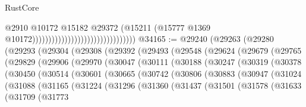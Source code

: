 \begin{lexlean}{RustCore}
\begin{coremodule}
                                                                @2910
                                                                @10172
                                                                @15182
                                                                @29372
                                                                (@15211
                                                                  (@15777
                                                                    @1369
                                                                    @10172))))))))))))))))))))))))))))))))
@34165 := @29240
    (@29263
      (@29280
        (@29293
          (@29304
            (@29308
              (@29392
                (@29493
                  (@29548
                    (@29624
                      (@29679
                        (@29765
                          (@29829
                            (@29906
                              (@29970
                                (@30047
                                  (@30111
                                    (@30188
                                      (@30247
                                        (@30319
                                          (@30378
                                            (@30450
                                              (@30514
                                                (@30601
                                                  (@30665
                                                    (@30742
                                                      (@30806
                                                        (@30883
                                                          (@30947
                                                            (@31024
                                                              (@31088
                                                                (@31165
                                                                  (@31224
                                                                    (@31296
                                                                      (@31360
                                                                        (@31437
                                                                          (@31501
                                                                            (@31578
                                                                              (@31633
                                                                                (@31709
                                                                                  (@31773

\end{coremodule}
\end{lexlean}
